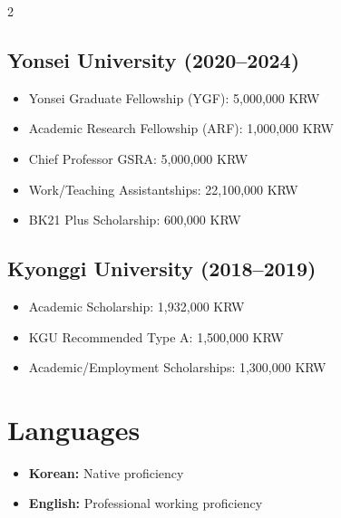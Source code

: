\documentclass[10pt,a4paper]{article}
\begin{document}
\begin{multicols}{2}
\subsection*{Yonsei University (2020--2024)}
\begin{itemize}[leftmargin=1em]
    \setlength\itemsep{0.1em}
    \item Yonsei Graduate Fellowship (YGF): 5,000,000 KRW
    \item Academic Research Fellowship (ARF): 1,000,000 KRW
    \item Chief Professor GSRA: 5,000,000 KRW
    \item Work/Teaching Assistantships: 22,100,000 KRW
    \item BK21 Plus Scholarship: 600,000 KRW
\end{itemize}

\columnbreak

\subsection*{Kyonggi University (2018--2019)}
\begin{itemize}[leftmargin=1em]
    \setlength\itemsep{0.1em}
    \item Academic Scholarship: 1,932,000 KRW
    \item KGU Recommended Type A: 1,500,000 KRW
    \item Academic/Employment Scholarships: 1,300,000 KRW
\end{itemize}
\end{multicols}

\vspace{0.5em}

\section*{Languages}
\begin{itemize}[leftmargin=1em]
    \item \textbf{Korean:} Native proficiency
    \item \textbf{English:} Professional working proficiency
\end{itemize}
\end{document}
